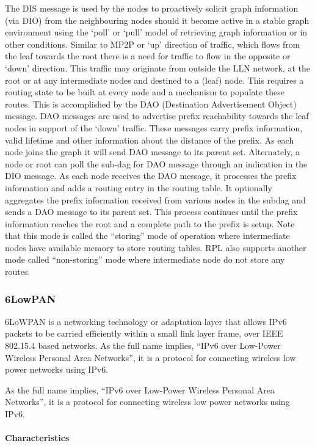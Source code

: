The DIS message is used by the nodes to proactively solicit graph information (via DIO) from the neighbouring nodes should it become active in a stable graph environment using the ‘poll’ or ‘pull’ model of retrieving graph information or in other conditions.
Similar to MP2P or ‘up’ direction of traffic,
	which flows from the leaf towards the root there is a need for traffic to flow in the opposite or ‘down’ direction.
This traffic may originate from outside the LLN network,
	at the root or at any intermediate nodes and destined to a (leaf) node.
This requires a routing state to be built at every node and a mechanism to populate these routes.
This is accomplished by the DAO (Destination Advertisement Object) message.
DAO messages are used to advertise prefix reachability towards the leaf nodes in support of the ‘down’ traffic.
These messages carry prefix information,
	valid lifetime and other information about the distance of the prefix.
As each node joins the graph it will send DAO message to its parent set.
Alternately,
	a node or root can poll the sub-dag for DAO message through an indication in the DIO message.
As each node receives the DAO message,
	it processes the prefix information and adds a routing entry in the routing table.
It optionally aggregates the prefix information received from various nodes in the subdag and sends a DAO message to its parent set.
This process continues until the prefix information reaches the root and a complete path to the prefix is setup.
Note that this mode is called the “storing” mode of operation where intermediate nodes have available memory to store routing tables.
RPL also supports another mode called “non-storing” mode where intermediate node do not store any routes.


\subsubsection{6LowPAN}

6LoWPAN is a networking technology or adaptation layer that allows IPv6 packets to be carried efficiently within a small link layer frame,
	over IEEE 802.15.4 based networks.
As the full name implies,
	“IPv6 over Low-Power Wireless Personal Area Networks”,
	it is a protocol for connecting wireless low power networks using IPv6.

As the full name implies,
	“IPv6 over Low-Power Wireless Personal Area Networks”,
	it is a protocol for connecting wireless low power networks using IPv6.

\paragraph{Characteristics}

